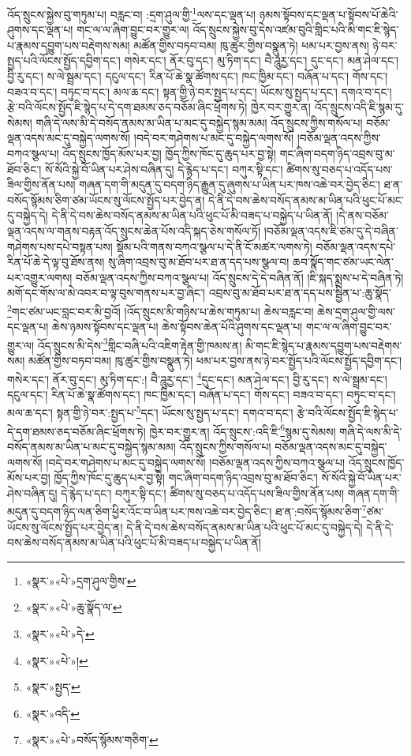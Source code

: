 འོད་སྲུངས་སྐྱེས་བུ་གཏུམ་པ། བརླང་བ། :དྲག་ཤུལ་གྱི་\footnote{«སྣར་»«པེ་»དྲག་ཤུལ་གྱིས་}ལས་དང་ལྡན་པ། ཉམས་སྟོབས་དང་ལྡན་པ་སྟོབས་པོ་ཆེའི་ཤུགས་དང་ལྡན་པ། གང་ལ་ལ་ཞིག་བྱུང་བར་གྱུར་ལ། འོད་སྲུངས་སྐྱེས་བུ་དེས་འཛམ་བུའི་གླིང་པའི་མི་གང་ཇི་སྙེད་པ་རྣམས་དབྱུག་པས་བརྡེགས་སམ། མཚོན་གྱིས་བཏབ་བམ། ཁུ་ཚུར་གྱིས་བསྣུན་ཏེ། ཕམ་པར་བྱས་ནས། ཉེ་བར་སྤྱད་པའི་ལོངས་སྤྱོད་དབྱིག་དང་། གསེར་དང་། ནོར་བུ་དང་། མུ་ཏིག་དང་། བཻ་ཌཱུརྱ་དང་། དུང་དང་། མན་ཤེལ་དང་། བྱི་རུ་དང་། ས་ལེ་སྦྲམ་དང་། དངུལ་དང་། རིན་པོ་ཆེ་སྣ་ཚོགས་དང་། ཁང་ཁྱིམ་དང་། བཞོན་པ་དང་། གོས་དང་། བཟའ་བ་དང་། བཏུང་བ་དང་། མལ་ཆ་དང་། སྟན་གྱི་ཉེ་བར་སྤྱད་པ་དང་། ཡོངས་སུ་སྤྱད་པ་དང་། དགའ་བ་དང་། རྩེ་བའི་ལོངས་སྤྱོད་ཇི་སྙེད་པ་དེ་དག་ཐམས་ཅད་བཅོམ་ཞིང་ཕྲོགས་ཏེ། ཁྱེར་བར་གྱུར་ན། འོད་སྲུངས་འདི་ཇི་སྙམ་དུ་སེམས། གཞི་དེ་ལས་མི་དེ་བསོད་ནམས་མ་ཡིན་པ་མང་དུ་བསྐྱེད་སྙམ་མམ། འོད་སྲུངས་ཀྱིས་གསོལ་པ། བཅོམ་ལྡན་འདས་མང་དུ་བསྐྱེད་ལགས་སོ། །བདེ་བར་གཤེགས་པ་མང་དུ་བསྐྱེད་ལགས་སོ། །བཅོམ་ལྡན་འདས་ཀྱིས་བཀའ་སྩལ་པ། འོད་སྲུངས་ཁྱོད་མོས་པར་བྱ། ཁྱོད་ཀྱིས་ཁོང་དུ་ཆུད་པར་བྱ་སྟེ། གང་ཞིག་བདག་ཉིད་འབྲས་བུ་མ་ཐོབ་ཅིང་། སོ་སོའི་སྐྱེ་བོ་ཡིན་པར་ཤེས་བཞིན་དུ། དེ་རྙེད་པ་དང་། བཀུར་སྟི་དང་། ཚིགས་སུ་བཅད་པ་འདོད་པས་ཟིལ་གྱིས་ནོན་པས། གཞན་དག་གི་མདུན་དུ་བདག་ཉིད་རྒྱུན་དུ་ཞུགས་པ་ཡིན་པར་ཁས་འཆེ་བར་བྱེད་ཅིང་། ཐ་ན་བསོད་སྙོམས་ཅིག་ཙམ་ཡོངས་སུ་ལོངས་སྤྱོད་པར་བྱེད་ན། དེ་ནི་དེ་བས་ཆེས་བསོད་ནམས་མ་ཡིན་པའི་ཕུང་པོ་མང་དུ་བསྐྱེད་དེ། དེ་ནི་དེ་བས་ཆེས་བསོད་ནམས་མ་ཡིན་པའི་ཕུང་པོ་མི་བཟད་པ་བསྐྱེད་པ་ཡིན་ནོ། །དེ་ནས་བཅོམ་ལྡན་འདས་ལ་གནས་བརྟན་འོད་སྲུངས་ཆེན་པོས་འདི་སྐད་ཅེས་གསོལ་ཏོ། །བཅོམ་ལྡན་འདས་ཇི་ཙམ་དུ་དེ་བཞིན་གཤེགས་པས་དཔེ་བསྟན་པས། སྡོམ་པའི་གནས་བཀའ་སྩལ་པ་དེ་ནི་ངོ་མཚར་ལགས་ཏེ། བཅོམ་ལྡན་འདས་དཔེ་རིན་པོ་ཆེ་དེ་ལྟ་བུ་ཐོས་ནས། སུ་ཞིག་འབྲས་བུ་མ་ཐོབ་པར་ཐ་ན་དད་པས་སྩལ་བ། ཆབ་སྣོད་གང་ཙམ་ཡང་ལེན་པར་འགྱུར་ལགས། བཅོམ་ལྡན་འདས་ཀྱིས་བཀའ་སྩལ་པ། འོད་སྲུངས་དེ་དེ་བཞིན་ནོ། །ཇི་སྐད་སྨྲས་པ་དེ་བཞིན་ཏེ། མགོ་དང་གོས་ལ་མེ་འབར་བ་ལྟ་བུས་གནས་པར་བྱ་ཞིང་། འབྲས་བུ་མ་ཐོབ་པར་ཐ་ན་དད་པས་སྦྱིན་པ་:ཆུ་སྣོད་\footnote{«སྣར་»«པེ་»ཆུ་སྣོད་ལ་}གང་ཙམ་ཡང་བླང་བར་མི་བྱའོ། །འོད་སྲུངས་མི་གཉིས་པ་ཆེས་གཏུམ་པ། ཆེས་བརླང་བ། ཆེས་དྲག་ཤུལ་གྱི་ལས་དང་ལྡན་པ། ཆེས་ཉམས་སྟོབས་དང་ལྡན་པ། ཆེས་སྟོབས་ཆེན་པོའི་ཤུགས་དང་ལྡན་པ། གང་ལ་ལ་ཞིག་བྱུང་བར་གྱུར་ལ། འོད་སྲུངས་མི་དེས་\footnote{«སྣར་»«པེ་»དེ་}གླིང་བཞི་པའི་འཇིག་རྟེན་གྱི་ཁམས་ན། མི་གང་ཇི་སྙེད་པ་རྣམས་དབྱུག་པས་བརྡེགས་སམ། མཚོན་གྱིས་བཏབ་བམ། ཁུ་ཚུར་གྱིས་བསྣུན་ཏེ། ཕམ་པར་བྱས་ནས་ཉེ་བར་སྤྱོད་པའི་ལོངས་སྤྱོད་དབྱིག་དང་། གསེར་དང་། ནོར་བུ་དང་། མུ་ཏིག་དང་:། བཻ་ཌཱུརྱ་དང་། \footnote{«སྣར་»«པེ་»།  }དུང་དང་། མན་ཤེལ་དང་། བྱི་རུ་དང་། ས་ལེ་སྦྲམ་དང་། དངུལ་དང་། རིན་པོ་ཆེ་སྣ་ཚོགས་དང་། ཁང་ཁྱིམ་དང་། བཞོན་པ་དང་། གོས་དང་། བཟའ་བ་དང་། བཏུང་བ་དང་། མལ་ཆ་དང་། སྟན་གྱི་ཉེ་བར་:སྤྱད་པ་\footnote{«སྣར་»སྤྱད་}དང་། ཡོངས་སུ་སྤྱད་པ་དང་། དགའ་བ་དང་། རྩེ་བའི་ལོངས་སྤྱོད་ཇི་སྙེད་པ་དེ་དག་ཐམས་ཅད་བཅོམ་ཞིང་ཕྲོགས་ཏེ། ཁྱེར་བར་གྱུར་ན། འོད་སྲུངས་:འདི་ཇི་\footnote{«སྣར་»འདི་}སྙམ་དུ་སེམས། གཞི་དེ་ལས་མི་དེ་བསོད་ནམས་མ་ཡིན་པ་མང་དུ་བསྐྱེད་སྙམ་མམ། འོད་སྲུངས་ཀྱིས་གསོལ་པ། བཅོམ་ལྡན་འདས་མང་དུ་བསྐྱེད་ལགས་སོ། །བདེ་བར་གཤེགས་པ་མང་དུ་བསྐྱེད་ལགས་སོ། །བཅོམ་ལྡན་འདས་ཀྱིས་བཀའ་སྩལ་པ། འོད་སྲུངས་ཁྱོད་མོས་པར་བྱ། ཁྱོད་ཀྱིས་ཁོང་དུ་ཆུད་པར་བྱ་སྟེ། གང་ཞིག་བདག་ཉིད་འབྲས་བུ་མ་ཐོབ་ཅིང་། སོ་སོའི་སྐྱེ་བོ་ཡིན་པར་ཤེས་བཞིན་དུ། དེ་རྙེད་པ་དང་། བཀུར་སྟི་དང་། ཚིགས་སུ་བཅད་པ་འདོད་པས་ཟིལ་གྱིས་ནོན་པས། གཞན་དག་གི་མདུན་དུ་བདག་ཉིད་ལན་ཅིག་ཕྱིར་འོང་བ་ཡིན་པར་ཁས་འཆེ་བར་བྱེད་ཅིང་། ཐ་ན་:བསོད་སྙོམས་ཅིག་\footnote{«སྣར་»«པེ་»བསོད་སྙོམས་གཅིག་}ཙམ་ཡོངས་སུ་ལོངས་སྤྱོད་པར་བྱེད་ན། དེ་ནི་དེ་བས་ཆེས་བསོད་ནམས་མ་ཡིན་པའི་ཕུང་པོ་མང་དུ་བསྐྱེད་དེ། དེ་ནི་དེ་བས་ཆེས་བསོད་ནམས་མ་ཡིན་པའི་ཕུང་པོ་མི་བཟད་པ་བསྐྱེད་པ་ཡིན་ནོ། 